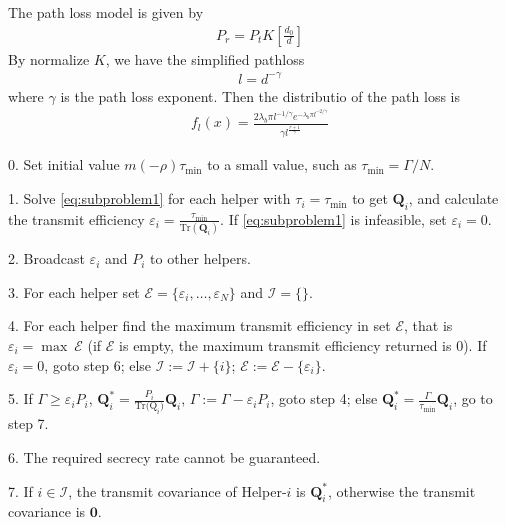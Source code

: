 \documentclass[12pt,journal,draftclsnofoot,onecolumn]{IEEEtran}
\begin{document}
The path loss model is given by
\begin{eqnarray}
P_r = P_tK\left[\frac{d_0}{d}\right]
\end{eqnarray}
By normalize $K$, we have the simplified pathloss
\begin{eqnarray}
l = d^{-\gamma}
\end{eqnarray}
where $\gamma$ is the path loss exponent. Then the distributio of the path loss is 
\begin{eqnarray}
f_l(x) = \frac{2\lambda_b\pi l^{-1/\gamma} e^{-\lambda_b\pi l^{-2/\gamma}}}{\gamma l^{\frac{r+1}{\gamma}}}
\end{eqnarray}







\begin{algorithm}
	\caption{}\label{alg:regularization parameter}
	\begin{algorithmic}
		\item[0.] Set initial value $m(-\rho)$$\tau_{\mathrm{min}}$ to a small value, such as $\tau_{\mathrm{min}} = \Gamma/N$. 
		\item[1.] Solve \eqref{eq:subproblem1} for each helper with $\tau_i = \tau_{\mathrm{min}}$ to get $\mathbf{Q}_i$, and calculate the transmit efficiency $\varepsilon_i = \frac{\tau_{\mathrm{min}}}{\mathrm{Tr}(\mathbf{Q}_i)}$. If \eqref{eq:subproblem1} is infeasible, set $\varepsilon_i = 0$.
		\item[2.] Broadcast $\varepsilon_i$ and $P_i$ to other helpers. 
		\item[3.] For each helper set $\mathcal{E} =\{ {\varepsilon_i,\ldots, \varepsilon_N}\}$ and $\mathcal{I} =\{\}$.
		\item[4.] For each helper find the maximum transmit efficiency in set $\mathcal{E}$, that is $\varepsilon_i = \max~\mathcal{E}$ (if $\mathcal{E}$ is empty,  the maximum transmit efficiency returned is 0). If $\varepsilon_i = 0$, goto step 6; else $\mathcal{I} := \mathcal{I} + \{i\}$; $\mathcal{E} := \mathcal{E}  - \{\varepsilon_i\}$.
		\item[5.] If $\Gamma \geq \varepsilon_{i} P_i$, $\mathbf{Q}_{i}^* = \frac{P_i}{\mathrm{Tr(\mathrm{Q}}_i)}\mathbf{Q}_i$, $\Gamma := \Gamma - \varepsilon_iP_i$, goto step 4; else $\mathbf{Q}_{i}^* = \frac{\Gamma}{\tau_\mathrm{min}}\mathbf{Q}_i$, go to step 7.
		\item[6.] The required secrecy rate cannot be guaranteed.
		\item[7.] If $i \in \mathcal{I}$, the transmit covariance of Helper-$i$ is $\mathbf{Q}_i^*$, otherwise the transmit covariance is $\mathbf{0}$.
		
	\end{algorithmic}
\end{algorithm}
\end{document}
